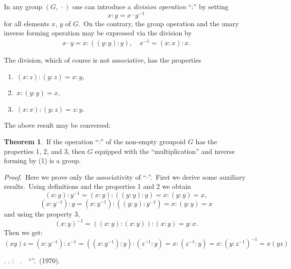 \documentclass[12pt]{article}
\theoremstyle{definition}
\newtheorem*{thmplain}{Theorem}
\begin{document}
In any group $(G,\,\cdot)$ one can introduce a {\em division operation} ``:'' by setting
            $$x:y = x \cdot y^{-1}$$
for all elements $x$, $y$ of $G$. \,On the contrary, the group operation and the unary inverse forming operation may be expressed via the division by
\begin{align}
x \cdot y = x:((y:y):y), \quad x^{-1} = (x:x):x.
\end{align}

The division, which of course is not associative, has the properties
\begin{enumerate} 
\item \,$(x:z):(y:z) = x:y,$  
\item \,$x:(y:y) = x,$
\item \,$(x:x):(y:z) = z:y.$
\end{enumerate}

The above result may be conversed:
\begin{thmplain}
\,If the operation ``:'' of the non-empty groupoid $G$ has the properties 1, 2, and 3, then $G$ equipped with the ``multiplication'' and inverse forming by (1) is a group.
\end{thmplain}

{\em Proof.} \,Here we prove only the associativity of ``$\cdot$''. \,First we derive some auxiliary results. \,Using definitions and the properties 1 and 2 we obtain
$$(x:y):y^{-1} = (x:y):((y:y):y) = x:(y:y) = x,$$
$$(x:y^{-1}):y = (x:y^{-1}):((y:y):y^{-1}) = x:(y:y) = x$$
and using the property 3, 
$$(x:y)^{-1} = ((x:y):(x:y)):(x:y) = y:x.$$
Then we get: 
$$(xy)z = (x:y^{-1}):z^{-1} = ((x:y^{-1}):y):(z^{-1}:y) = 
  x:(z^{-1}:y) = x:(y:z^{-1})^{-1} = x(yz)$$


\begin{thebibliography}{7}
 \CYRA. \CYRI. \CYRM\cyra\cyrl\cyrsftsn\cyrc\cyre\cyrv: 
{\em \CYRA\cyrl\cyrg\cyre\cyrb\cyrr\cyra\cyri\cyrch\cyre\cyrs\cyrk\cyri\cyre \,
\cyrs\cyri\cyrs\cyrt\cyre\cyrm\cyrery}. \,\CYRI\cyrz\cyrd\cyra\cyrt\cyre\cyrl\cyrsftsn\cyrs\cyrt\cyrv\cyro \,
``\CYRN\cyra\cyru\cyrk\cyra''. \CYRM\cyro\cyrs\cyrk\cyrv\cyra \,(1970).
\end{thebibliography}
\end{document}
